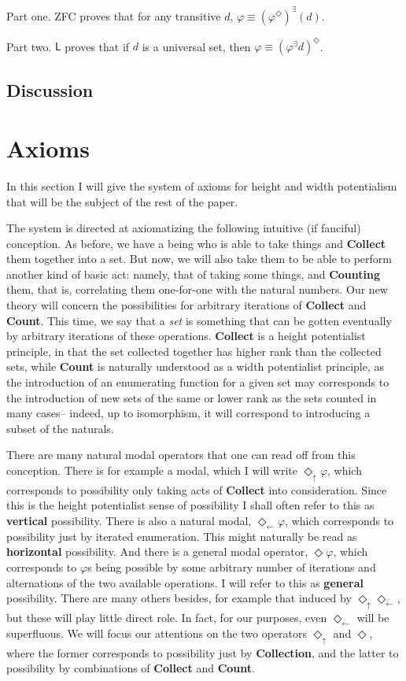 \documentclass{article}
\newcommand{\du}{\Diamond_\uparrow}
\newcommand{\dl}{\Diamond_\leftarrow}
\begin{document}
Part one. ZFC proves that for any transitive $d$, 
$\varphi \equiv (\varphi^\Diamond)^\exists(d)$.

Part two. $\mathsf{L}$ proves that if $d$ is a universal set,
then $\varphi \equiv (\varphi^\exists d)^\Diamond$.


\subsection{Discussion}
\section{Axioms}
In this section I will give the system of axioms for height and width potentialism 
that will be the subject of the rest of the paper.

The system is directed at axiomatizing the following intuitive (if fanciful) conception.
As before, we have a being who is able to take things and {\bf Collect} them together into a set.
But now, we will also take them to be able to perform another kind of basic act: namely, 
that of taking some things, and {\bf Counting} them, that is, correlating them one-for-one
with the natural numbers. Our new theory will concern the possibilities for arbitrary iterations 
of {\bf Collect} and {\bf Count}. This time, we say that a \emph{set} is something that can be 
gotten eventually by arbitrary iterations of these operations. {\bf Collect} is a height potentialist 
principle, in that the set collected together has higher rank than the collected sets, 
while {\bf Count} is naturally understood as a width potentialist principle, 
as the introduction of an enumerating function for a given set may corresponds to the introduction 
of new sets of the same or lower rank as the sets counted in many cases--
indeed, up to isomorphism, it will correspond to introducing a subset of the naturals.

There are many natural modal operators that one can read off from this conception. 
There is for example a modal, which I will write $\du \varphi$, which corresponds to 
possibility only taking acts of {\bf Collect} into consideration. Since this is the 
height potentialist sense of possibility I shall often refer to this as {\bf vertical}
possibility. There is also a natural modal, $\dl \varphi$, which corresponds to possibility 
just by iterated enumeration. This might naturally be read as {\bf horizontal} possibility.
 And there is a general modal operator, $\Diamond \varphi$, which 
corresponds to $\varphi$s being possible by some arbitrary number of iterations and alternations 
of the two available operations. I will refer to this as {\bf general} possibility. There are 
many others besides, for example that induced by $\du\dl$, but these will play little direct role.
In fact, for our purposes, even $\dl$ will be superfluous. We will focus our attentions on 
the two operators $\du$ and $\Diamond$, where the former corresponds to possibility just by 
{\bf Collection}, and the latter to possibility by combinations of {\bf Collect} and {\bf Count}.
\end{document}
